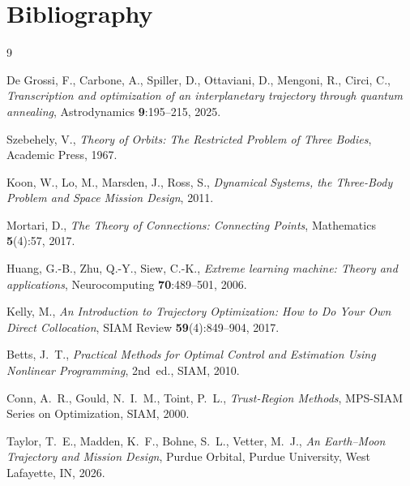 \documentclass[8pt,a4paper]{article}
\theoremstyle{definition}
\theoremstyle{remark}
\begin{document}
\section*{Bibliography}
\begin{thebibliography}{9}

  De Grossi, F., Carbone, A., Spiller, D., Ottaviani, D.,
  Mengoni, R., Circi, C.,
  \emph{Transcription and optimization of an interplanetary trajectory through quantum annealing},
  Astrodynamics \textbf{9}:195--215, 2025.

  Szebehely, V., \emph{Theory of Orbits: The Restricted Problem of
   Three Bodies}, Academic Press, 1967.

  Koon, W., Lo, M., Marsden, J., Ross, S., \emph{Dynamical Systems,
   the Three-Body Problem and Space Mission Design}, 2011.

  Mortari, D., \emph{The Theory of Connections: Connecting Points},
  Mathematics \textbf{5}(4):57, 2017.

  Huang, G.-B., Zhu, Q.-Y., Siew, C.-K.,
  \emph{Extreme learning machine: Theory and applications},
  Neurocomputing \textbf{70}:489--501, 2006.

  Kelly, M.,
  \emph{An Introduction to Trajectory Optimization: How to Do Your
   Own Direct Collocation},
  SIAM Review \textbf{59}(4):849--904, 2017.

  Betts, J.~T.,
  \emph{Practical Methods for Optimal Control and Estimation Using
   Nonlinear Programming}, 2nd~ed., SIAM, 2010.

  Conn, A.~R., Gould, N.~I.~M., Toint, P.~L.,
  \emph{Trust-Region Methods},
  MPS-SIAM Series on Optimization, SIAM, 2000.

  Taylor, T.~E., Madden, K.~F., Bohne, S.~L., Vetter, M.~J.,
  \emph{An Earth--Moon Trajectory and Mission Design},
  Purdue Orbital, Purdue University, West Lafayette, IN, 2026.

\end{thebibliography}
\end{document}
